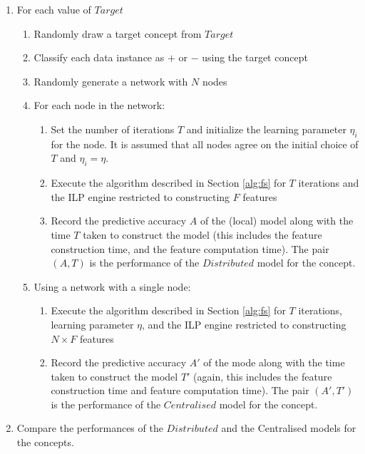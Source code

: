 \begin{enumerate}
\item For each value of $Target$ \\
      \begin{enumerate}
        \item Randomly draw a target concept from $Target$ \label{meth:drawtarget}
        \item Classify each data instance as $+$ or $-$ using the target concept
        \item Randomly generate a network with $N$ nodes
        \item For each node in the network:
            \begin{enumerate}
                \item Set the number of iterations $T$ and initialize the
                    learning parameter $\eta_i$ for the
                    node. It is assumed that all nodes agree on the initial choice of
                    $T$ and $\eta_i = \eta$. 
               \item Execute the algorithm described in Section \ref{alg:fs} for $T$ iterations
                    and the ILP engine restricted to constructing $F$ features
               \item Record the predictive accuracy $A$ of the (local) model along with
                          the time $T$ taken to construct the model (this includes
                          the feature construction time, and the feature computation time).
                          The pair $(A,T)$ is the performance of the $Distributed$ model for the concept.
            \end{enumerate}
        \item Using a network with a single node:
            \begin{enumerate}
                \item Execute the
                    algorithm described in Section \ref{alg:fs} for $T$ iterations, learning
                    parameter $\eta$, 
                    and the ILP engine restricted to constructing $N \times F$ features
               \item Record the predictive accuracy $A'$ of the mode along with the time
                    taken to construct the model $T'$ (again, this includes the feature construction
                    time and feature computation time).
                    The pair $(A',T')$ is the performance of the $Centralised$ model for the concept.
            \end{enumerate}
      \end{enumerate}
      \item Compare the performances of the $Distributed$ and the Centralised models for the concepts.
\end{enumerate}

